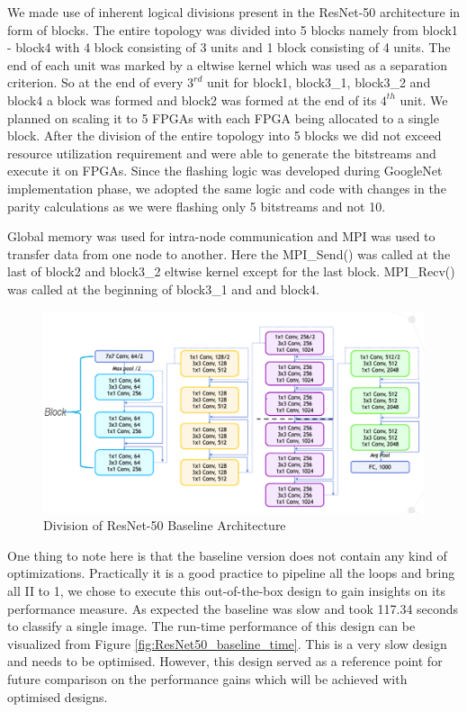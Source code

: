 We made use of inherent logical divisions present in the ResNet-50 architecture in form of blocks. The entire topology was divided into 5 blocks namely from block1 - block4 with 4 block consisting of 3 units and 1 block consisting of 4 units. The end of each unit was marked by a eltwise kernel which was used as a separation criterion. So at the end of every $3^{rd}$ unit for block1, block3\_1, block3\_2 and block4 a block was formed and block2 was formed at the end of its $4^{th}$ unit. We planned on scaling it to 5 FPGAs with each FPGA being allocated to a  single block. 
After the division of the entire topology into 5 blocks we did not exceed resource utilization requirement and were able to generate the bitstreams and execute it on FPGAs. Since the flashing logic was developed during GoogleNet implementation phase, we adopted the same logic and code with changes in the parity calculations as we were flashing only 5 bitstreams and not 10.   

Global memory was used for intra-node communication and MPI was used to transfer data from one node to another. Here the MPI\_Send() was called at the last of block2 and block3\_2 eltwise kernel except for the last block. MPI\_Recv() was called at the beginning of block3\_1 and and block4.

\begin{figure}[!htb]
  \includegraphics[width=\textwidth,height=\textheight,keepaspectratio]{img/ResNet_division.png}
  \caption{Division of ResNet-50 Baseline Architecture}
  \label{fig:ResNet50_baseline_division}
\end{figure}


One thing to note here is that the baseline version does not contain any kind of optimizations. Practically it is a good practice to pipeline all the loops and bring all II to 1, we chose to execute this out-of-the-box design to gain insights on its performance measure.
As expected the baseline was slow and took 117.34 seconds to classify a single image. The run-time performance of this design can be visualized from Figure \ref{fig:ResNet50_baseline_time}. This is a very slow design and needs to be optimised. However, this design served as a reference point for future comparison on the performance gains which will be achieved with optimised designs.

